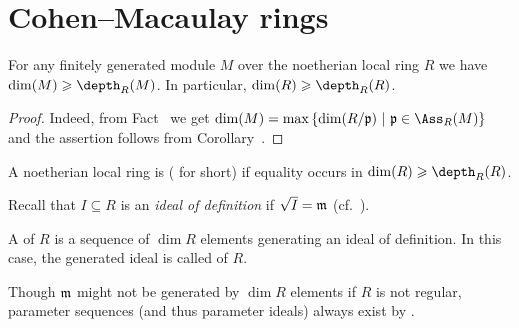 \documentclass[a4paper,parskip=half,numbers=enddot, DIV=12]{scrreprt}
\renewcommand{\geq}{\geqslant}
\begin{document}
\section{Cohen--Macaulay rings}
\begin{fact}
	For any finitely generated module $M$ over the noetherian local ring $R$ we have $\dim(M)\geq\depth_R(M)$. In particular, $\dim(R)\geq\depth_R(R)$.
\end{fact}
\begin{proof}
	Indeed, from Fact~ we get $\dim(M)=\max\left\{\dim(R/\pp)\st \pp\in\Ass_R(M)\right\}$ and the assertion follows from Corollary~.
\end{proof}
\begin{defi}
	A noetherian local ring is  ( for short) if equality occurs in $\dim(R)\geq\depth_R(R)$.
\end{defi}
Recall that $I\subseteq R$ is an \emph{ideal of definition} if $\sqrt{I}=\mathfrak{m}$ (cf.\ \cite[Definition~3.4.2]{alg2}). 
\begin{defi}
	A  of $R$ is a sequence of $\dim R$ elements generating an ideal of definition. In this case, the generated ideal is called  of $R$.
\end{defi}
Though $\mathfrak{m}$ might not be generated by $\dim R$ elements if $R$ is not regular, parameter sequences (and thus parameter ideals) always exist by \cite[Theorem~20]{alg2}.
\end{document}
